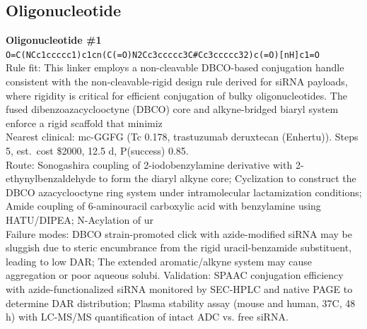 \documentclass[10pt]{article}
\begin{document}
\subsection{Oligonucleotide}
\noindent\textbf{Oligonucleotide \#1} \\ \texttt{O=C(NCc1ccccc1)c1cn(C(=O)N2Cc3ccccc3C\#Cc3ccccc32)c(=O)[nH]c1=O} \\ Rule fit: This linker employs a non-cleavable DBCO-based conjugation handle consistent with the non-cleavable-rigid design rule derived for siRNA payloads, where rigidity is critical for efficient conjugation of bulky oligonucleotides. The fused dibenzoazacyclooctyne (DBCO) core and alkyne-bridged biaryl system enforce a rigid scaffold that minimiz \\ Nearest clinical: mc-GGFG (Tc 0.178, trastuzumab deruxtecan (Enhertu)). Steps 5, est.\ cost \$2000, 12.5 d, P(success) 0.85. \\ Route: Sonogashira coupling of 2-iodobenzylamine derivative with 2-ethynylbenzaldehyde to form the diaryl alkyne core; Cyclization to construct the DBCO azacyclooctyne ring system under intramolecular lactamization conditions; Amide coupling of 6-aminouracil carboxylic acid with benzylamine using HATU/DIPEA; N-Acylation of ur \\ Failure modes: DBCO strain-promoted click with azide-modified siRNA may be sluggish due to steric encumbrance from the rigid uracil-benzamide substituent, leading to low DAR; The extended aromatic/alkyne system may cause aggregation or poor aqueous solubi. Validation: SPAAC conjugation efficiency with azide-functionalized siRNA monitored by SEC-HPLC and native PAGE to determine DAR distribution; Plasma stability assay (mouse and human, 37\textdegree{}C, 48 h) with LC-MS/MS quantification of intact ADC vs. free siRNA. \\[0.4em]
\end{document}
